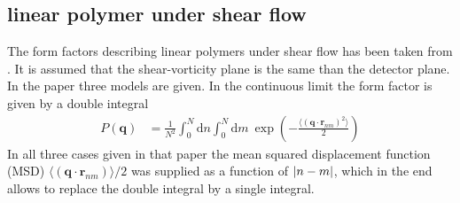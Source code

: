 \newpage
\subsection{linear polymer under shear flow}
\label{sect:LinearPolymerShearFlow}
The form factors describing linear polymers under shear flow has been taken from \cite{Korolkovas2019}.
It is assumed that the shear-vorticity plane is the same than the detector plane. In the paper three models are given. In the continuous limit the form factor is given by a double integral
\begin{align}
  P(\mathbf{q}) & = \frac{1}{N^2}\int_0^N\mathrm{d}n\int_0^N\mathrm{d}m\: \exp\left(-\frac{\langle(\mathbf{q}\cdot\mathbf{r}_{nm})^2\rangle}{2}\right)
\end{align}
In all three cases given in that paper the mean squared displacement function (MSD) $\langle(\mathbf{q}\cdot\mathbf{r}_{nm})\rangle/2$ was supplied as a function of $\abs{n-m}$, which in the end allows to replace the double integral by a single integral.
